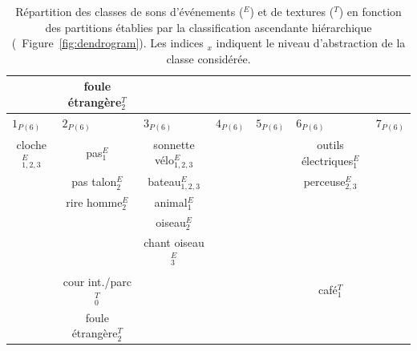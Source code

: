 \begin{table}[t]
\begin{tabular}{c|c|c|c|c|c|c}
                         &  foule étrangère$_2^T$  &                    & \multicolumn{2}{c|}{} &                     &  \\               
\hline
\multicolumn{1}{l|}{$1_{P(6)}$} & \multicolumn{1}{l|}{$2_{P(6)}$} & \multicolumn{1}{l|}{$3_{P(6)}$}  & \multicolumn{1}{l|}{$4_{P(6)}$} & \multicolumn{1}{l|}{$5_{P(6)}$} & \multicolumn{1}{l|}{$6_{P(6)}$} & \multicolumn{1}{l}{$7_{P(6)}$} \\  
cloche$_{1,2,3}^E$       & pas$_{1}^E$             & sonnette vélo$_{1,2,3}^E$ &     &     & outils électriques$_1^E$ &   \\        
                         & pas talon$_{2}^E$       & bateau$_{1,2,3}^E$        &     &     & perceuse$_{2,3}^E$     &  \\  
                         & rire homme$_{2}^E$      & animal$_{1}^E$            &     &     &                        & \\  
                         &                         & oiseau$_2^E$              &     &     &                        & \\  
                         &                         & chant oiseau$_3^E$        &     &     &                        & \\  
                         &                         &                           &     &     &                        & \\                            
                         & cour int./parc$_0^T$    &                           &     &     & café$_1^T$             & \\   
                         & foule étrangère$_2^T$   &                           &     &     &                        & \\     
\hline

\end{tabular}
\vspace{0.5mm}
\caption[Répartition des classes de sons en fonction des partitions établies par la classification ascendante hiérarchique.]{Répartition des classes de sons d'événements ($^E$) et de textures ($^T$) en fonction des partitions établies par la classification ascendante hiérarchique (\cf~Figure~\ref{fig:dendrogram}). Les indices $_{x}$ indiquent le niveau d'abstraction de la classe considérée.}
\label{tab:markerHacClass}
\end{table}
